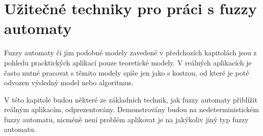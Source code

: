 \documentclass[a4paper,10pt]{article}
\begin{document}


\section{Užitečné techniky pro práci s fuzzy automaty}

Fuzzy automaty či jim podobné modely zavedené v předchozích kapitolách jsou z pohledu pracktických aplikací pouze teoretické modely. V reálných aplikacích je často nutné pracovat s těmito modely spíše jen jako s kostrou, od které je poté odvozen výsledný model nebo algoritmus.

V této kapitole budou některé ze základních technik, jak fuzzy automaty přiblížit reálným aplikacím, odprezentovány. Demonstrovány budou na nedeterministickém fuzzy automatu, nicméně není problém aplikovat je na jakýkoliv jiný typ fuzzy automatu.
\end{document}
